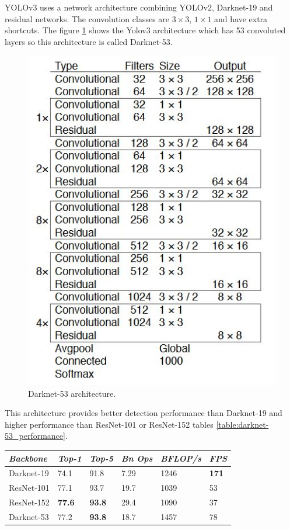 \documentclass[conference]{IEEEtran}
\begin{document}
YOLOv3 uses a network architecture combining YOLOv2, Darknet-19 and residual networks. The convolution classes are $ 3 \times 3 $, $ 1 \times 1 $ and have extra shortcuts. The figure \ref{fig:yolov3_architechture} shows the Yolov3 architecture which has 53 convoluted layers so this architecture is called Darknet-53.
\begin{figure}[ht]
	\centerline{\includegraphics[scale=0.7]{images/yolov3_architecture.jpg}}
  	\caption{Darknet-53 architecture.}
  	\label{fig:yolov3_architechture}
\end{figure}
This architecture provides better detection performance than Darknet-19 and higher performance than ResNet-101 or ResNet-152 tables \ref{table:darknet-53_performance}.
\begin{center}

  \begin{tabular} {l l l l l l}
  \toprule
  \it Backbone & \it Top-1 & \it Top-5 & \it Bn Ops & \it BFLOP/s & \it FPS \\
  \midrule

  Darknet-19 & 74.1 & 91.8 & 7.29 & 1246 & \textbf{171} \\
  ResNet-101 & 77.1 & 93.7 & 19.7 & 1039 & 53 \\
  ResNet-152 & \textbf{77.6} & \textbf{93.8} & 29.4 & 1090 & 37 \\
  Darknet-53 & 77.2 & \textbf{93.8} & 18.7 & 1457 & 78 \\
          
  \bottomrule
  \end{tabular}

\end{center}
\end{document}
